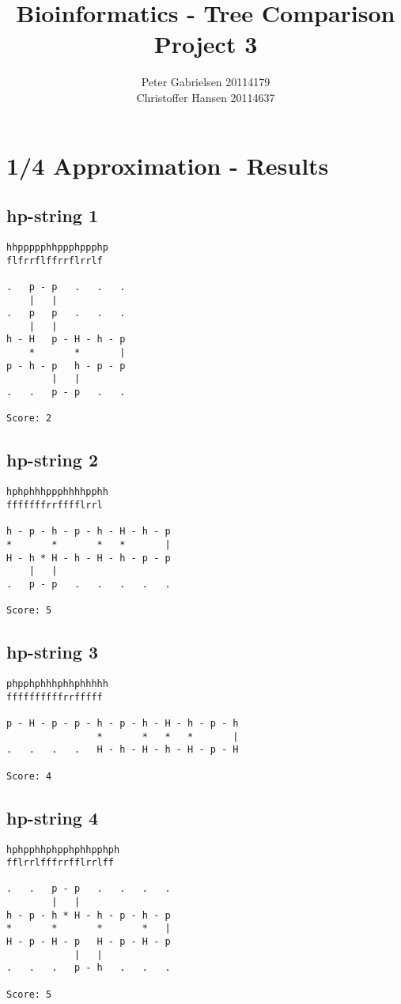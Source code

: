 \documentclass[a4paper,oneside,article,11pt]{memoir}
\title{Bioinformatics - Tree Comparison \\ Project 3}
\author{Peter Gabrielsen 20114179\\
Christoffer Hansen 20114637}
\begin{document}
\maketitle

\chapter*{1/4 Approximation - Results}

\section*{hp-string 1}
\begin{lstlisting}
hhppppphhppphppphp
flfrrflffrrflrrlf

.   p - p   .   .   .
    |   |
.   p   p   .   .   .
    |   |
h - H   p - H - h - p
    *       *       |
p - h - p   h - p - p
        |   |
.   .   p - p   .   .

Score: 2
\end{lstlisting}

\pagebreak

\section*{hp-string 2}
\begin{lstlisting}
hphphhhppphhhhpphh
fffffffrrfffflrrl

h - p - h - p - h - H - h - p
*       *       *   *       |
H - h * H - h - H - h - p - p
    |   |
.   p - p   .   .   .   .   .

Score: 5
\end{lstlisting}

\section*{hp-string 3}
\begin{lstlisting}
phpphphhhphhphhhhh
ffffffffffrrfffff

p - H - p - p - h - p - h - H - h - p - h
                *       *   *   *       |
.   .   .   .   H - h - H - h - H - p - H

Score: 4
\end{lstlisting}

\section*{hp-string 4}
\begin{lstlisting}
hphpphhphpphphhpphph
fflrrlfffrrfflrrlff

.   .   p - p   .   .   .   .
        |   |
h - p - h * H - h - p - h - p
*       *       *       *   |
H - p - H - p   H - p - H - p
            |   |
.   .   .   p - h   .   .   .

Score: 5
\end{lstlisting}
\end{document}
